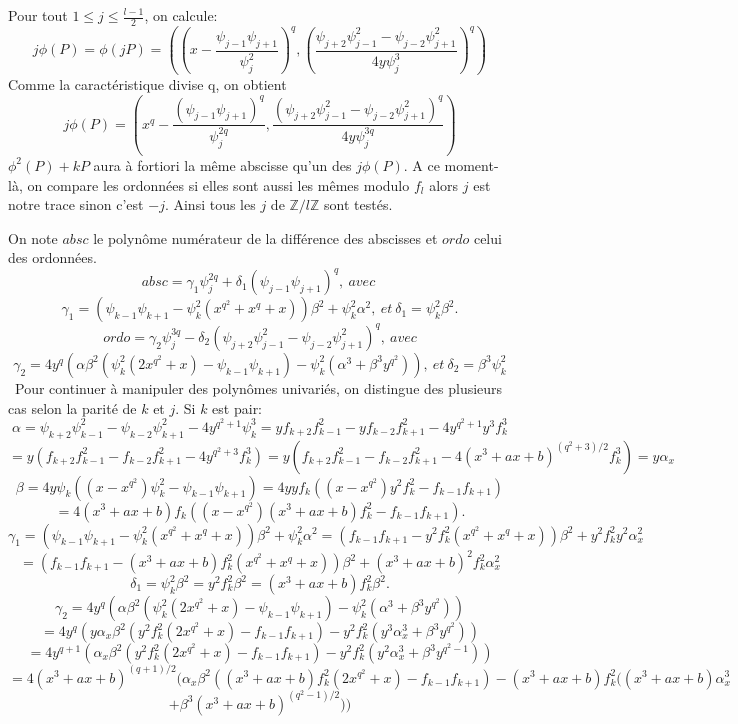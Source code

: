 \documentclass[letterpaper, 12pt]{article}
\newcommand{\Z}{\mathbb{Z}}
\begin{document}
Pour tout $1 \leq j \leq \frac{l-1}{2}$, on calcule:
$$ j\phi(P) = \phi(jP)= \left(\left(x-\frac{\psi_{j-1}\psi_{j+1}}{\psi_{j}^2}\right)^q,\left(\frac{\psi_{j+2}\psi_{j-1}^2-\psi_{j-2}\psi_{j+1}^2}{4y\psi_{j}^3}\right)^q\right) $$ Comme la caractéristique divise q, on obtient $$  j\phi(P) = \left(x^q-\frac{(\psi_{j-1}\psi_{j+1})^q}{\psi_{j}^{2q}},\frac{(\psi_{j+2}\psi_{j-1}^2-\psi_{j-2}\psi_{j+1}^2)^q}{4y\psi_{j}^{3q}}\right)$$
$\phi^2(P)+kP$ aura à fortiori la même abscisse qu'un des $j\phi(P)$. A ce moment-là, on compare les ordonnées si elles sont aussi les mêmes modulo $f_l$ alors $j$ est notre trace sinon c'est $-j$. Ainsi tous les $j$ de $\Z/l\Z $ sont testés.

On note $absc$ le polynôme numérateur de la différence des abscisses et $ordo$ celui des ordonnées.
$$ absc = \gamma_{1}\psi_{j}^{2q}+\delta_{1}(\psi_{j-1}\psi_{j+1})^q,\ avec\ $$
$$ \gamma_{1}=(\psi_{k-1}\psi_{k+1}-\psi_{k}^2(x^{q^2}+x^q+x))\beta^2+\psi_{k}^2\alpha^2,\ et\ \delta_{1} = \psi_{k}^2\beta^2. $$
$$ ordo = \gamma_{2}\psi_{j}^{3q}-\delta_{2}(\psi_{j+2}\psi_{j-1}^2-\psi_{j-2}\psi_{j+1}^2)^q,\ avec $$ $$ \gamma_{2} = 4y^q(\alpha\beta^2(\psi_{k}^2(2x^{q^2}+x)-\psi_{k-1}\psi_{k+1})-\psi_{k}^2(\alpha^3+\beta^3y^{q^2})),\ et\ \delta_{2} = \beta^3\psi_{k}^2 $$
\
Pour continuer à manipuler des polynômes univariés, on distingue des plusieurs cas selon la parité de $k$ et $j$.
\newline
\newline
Si $k$ est pair:
$$ \alpha = \psi_{k+2}\psi_{k-1}^2-\psi_{k-2}\psi_{k+1}^2-4y^{q^2+1}\psi_{k}^3 = yf_{k+2}f_{k-1}^2-yf_{k-2}f_{k+1}^2-4y^{q^2+1}y^3f_{k}^3$$ $$ = y(f_{k+2}f_{k-1}^2-f_{k-2}f_{k+1}^2-4y^{q^2+3}f_{k}^3) = y(f_{k+2}f_{k-1}^2-f_{k-2}f_{k+1}^2-4(x^3+ax+b)^{(q^2+3)/2}f_{k}^3) = y\alpha_x $$
\newline
$$ \beta = 4y\psi_{k}((x-x^{q^2})\psi_{k}^2-\psi_{k-1}\psi_{k+1}) = 4yyf_{k}((x-x^{q^2})y^2f_{k}^2-f_{k-1}f_{k+1}) $$ $$ = 4(x^3+ax+b)f_{k}((x-x^{q^2})(x^3+ax+b)f_{k}^2-f_{k-1}f_{k+1}). $$
\newline
$$ \gamma_{1} = (\psi_{k-1}\psi_{k+1}-\psi_{k}^2(x^{q^2}+x^q+x))\beta^2+\psi_{k}^2\alpha^2 = (f_{k-1}f_{k+1}-y^2f_{k}^2(x^{q^2}+x^q+x))\beta^2+y^2f_{k}^2y^2\alpha_{x}^2 $$ $$ = (f_{k-1}f_{k+1}-(x^3+ax+b)f_{k}^2(x^{q^2}+x^q+x))\beta^2+(x^3+ax+b)^2f_{k}^2\alpha_{x}^2 $$
\newline
$$ \delta_{1} = \psi_{k}^2\beta^2 = y^2f_{k}^2\beta^2 = (x^3+ax+b)f_{k}^2\beta^2. $$
\newline
$$ \gamma_{2} = 4y^q(\alpha\beta^2(\psi_{k}^2(2x^{q^2}+x)-\psi_{k-1}\psi_{k+1})-\psi_{k}^2(\alpha^3+\beta^3y^{q^2})) $$ $$ = 4y^q(y\alpha_x\beta^2(y^2f_{k}^2(2x^{q^2}+x)-f_{k-1}f_{k+1})-y^2f_{k}^2(y^3\alpha_{x}^3+\beta^3y^{q^2})) $$ $$ = 4y^{q+1}(\alpha_x\beta^2(y^2f_{k}^2(2x^{q^2}+x)-f_{k-1}f_{k+1})-y^2f_{k}^2(y^2\alpha_{x}^3+\beta^3y^{q^2-1})) $$ $$ = 4(x^3+ax+b)^{(q+1)/2}(\alpha_x\beta^2((x^3+ax+b)f_{k}^2(2x^{q^2}+x)-f_{k-1}f_{k+1})-(x^3+ax+b)f_{k}^2((x^3+ax+b)\alpha_{x}^3 $$ $$ +\beta^3(x^3+ax+b)^{(q^2-1)/2})) $$
\end{document}
